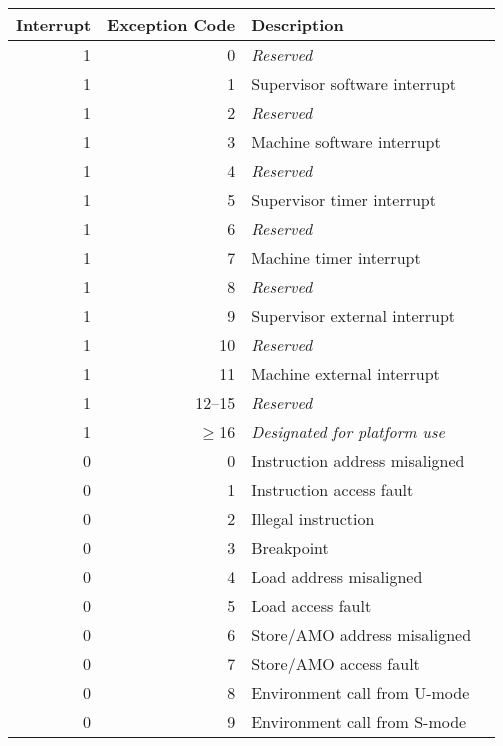 \begin{table*}[htbp]
\begin{center}
\begin{tabular}{|r|r|l|l|}

  \hline
  Interrupt & Exception Code  & Description \\
  \hline
  1         & 0               & {\em Reserved} \\
  1         & 1               & Supervisor software interrupt \\
  1         & 2               & {\em Reserved} \\
  1         & 3               & Machine software interrupt \\ \hline
  1         & 4               & {\em Reserved} \\
  1         & 5               & Supervisor timer interrupt \\
  1         & 6               & {\em Reserved} \\
  1         & 7               & Machine timer interrupt \\ \hline
  1         & 8               & {\em Reserved} \\
  1         & 9               & Supervisor external interrupt \\
  1         & 10              & {\em Reserved} \\
  1         & 11              & Machine external interrupt \\ \hline
  1         & 12--15          & {\em Reserved} \\
  1         & $\ge$16         & {\em Designated for platform use} \\ \hline
  0         & 0               & Instruction address misaligned \\
  0         & 1               & Instruction access fault \\
  0         & 2               & Illegal instruction \\
  0         & 3               & Breakpoint \\
  0         & 4               & Load address misaligned \\
  0         & 5               & Load access fault \\
  0         & 6               & Store/AMO address misaligned \\
  0         & 7               & Store/AMO access fault \\
  0         & 8               & Environment call from U-mode\\
  0         & 9               & Environment call from S-mode \\

\end{tabular}
\end{center}
\end{table*}
